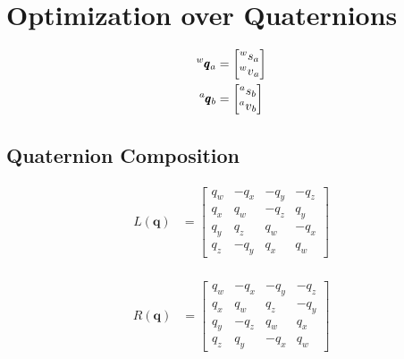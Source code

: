 \documentclass{article}
\begin{document}
\section{Optimization over Quaternions}

\begin{align*}
	\prescript{w}{}{\pmb{q}}_{a} & = \begin{bmatrix}
		                                 \prescript{w}{}{s}_a \\
		                                 \prescript{w}{}{v}_a
	                                 \end{bmatrix} \\
	\prescript{a}{}{\pmb{q}}_b   & = \begin{bmatrix}
		                                 \prescript{a}{}{s}_b \\
		                                 \prescript{a}{}{v}_b
	                                 \end{bmatrix}
\end{align*}

\subsection{Quaternion Composition}

\begin{align*}
	L \left( \pmb{q} \right) & = \begin{bmatrix}
		                             q_w & -q_x & -q_y & -q_z \\
		                             q_x & q_w  & -q_z & q_y  \\
		                             q_y & q_z  & q_w  & -q_x \\
		                             q_z & -q_y & q_x  & q_w
	                             \end{bmatrix} \\
\end{align*}

\begin{align*}
	R \left( \pmb{q} \right) & = \begin{bmatrix}
		                             q_w & -q_x & -q_y & -q_z \\
		                             q_x & q_w  & q_z  & -q_y \\
		                             q_y & -q_z & q_w  & q_x  \\
		                             q_z & q_y  & -q_x & q_w
	                             \end{bmatrix}
\end{align*}
\end{document}

